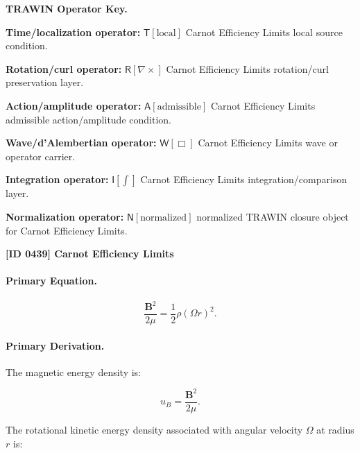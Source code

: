 \par\vspace{0.45\baselineskip}
\noindent\begin{minipage}[t]{\linewidth}
\begingroup
\small
\raggedright
\textbf{TRAWIN Operator Key.}\par
\noindent\textbf{Time/localization operator:} $\mathsf{T}\!\left[\mathrm{local}\right]$ Carnot Efficiency Limits local source condition.\par
\noindent\textbf{Rotation/curl operator:} $\mathsf{R}\!\left[\nabla\times\right]$ Carnot Efficiency Limits rotation/curl preservation layer.\par
\noindent\textbf{Action/amplitude operator:} $\mathsf{A}\!\left[\mathrm{admissible}\right]$ Carnot Efficiency Limits admissible action/amplitude condition.\par
\noindent\textbf{Wave/d'Alembertian operator:} $\mathsf{W}\!\left[\Box\right]$ Carnot Efficiency Limits wave or operator carrier.\par
\noindent\textbf{Integration operator:} $\mathsf{I}\!\left[\int\right]$ Carnot Efficiency Limits integration/comparison layer.\par
\noindent\textbf{Normalization operator:} $\mathsf{N}\!\left[\mathrm{normalized}\right]$ normalized TRAWIN closure object for Carnot Efficiency Limits.\par
\endgroup
\end{minipage}

\clearpage
\noindent\textbf{[ID 0439] Carnot Efficiency Limits}\par
\vspace{0.35em}
\paragraph{Primary Equation.}
\begin{equation}
\frac{\mathbf{B}^2}{2\mu}
=
\frac{1}{2}\rho(\Omega r)^2 .
\end{equation}

\paragraph{Primary Derivation.}
The magnetic energy density is:

\begin{equation}
u_B
=
\frac{\mathbf{B}^2}{2\mu}.
\end{equation}

The rotational kinetic energy density associated with angular velocity $\Omega$ at radius $r$ is:


